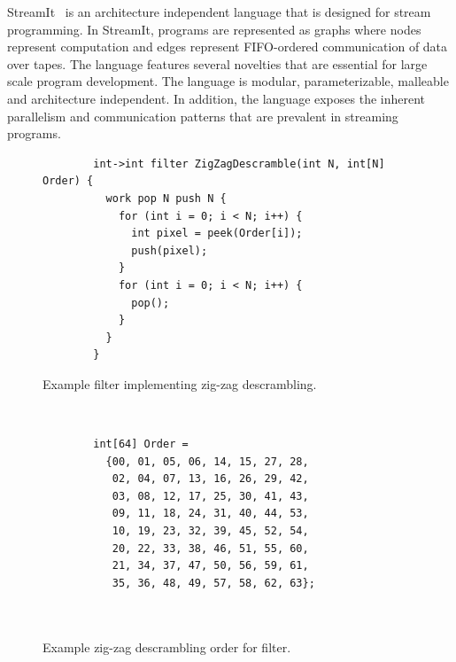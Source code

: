 \label{sec:streamit}

StreamIt~\cite{streamitcc} is an architecture independent language
that is designed for stream programming. In StreamIt, programs are
represented as graphs where nodes represent computation and edges
represent FIFO-ordered communication of data over tapes. The language
features several novelties that are essential for large scale program
development. The language is modular, parameterizable, malleable and
architecture independent. In addition, the language exposes the
inherent parallelism and communication patterns that are prevalent in
streaming programs.

\begin{figure}[t]
  \begin{minipage}[t]{4.0in}
    {
	\begin{scriptsize}
	  \begin{verbatim}
	    int->int filter ZigZagDescramble(int N, int[N] Order) {
	      work pop N push N {
	        for (int i = 0; i < N; i++) {
	          int pixel = peek(Order[i]);
	          push(pixel);
	        }
	        for (int i = 0; i < N; i++) {
	          pop();
	        }
	      }
	    }
	  \end{verbatim}
	\end{scriptsize}
    }
    \caption{Example filter implementing zig-zag descrambling.}
  \end{minipage}
  ~~\vrule~~
  \begin{minipage}[t]{3.0in}
    {  
	\begin{scriptsize}
	  \begin{verbatim}
	    int[64] Order = 
	      {00, 01, 05, 06, 14, 15, 27, 28,
	       02, 04, 07, 13, 16, 26, 29, 42,
	       03, 08, 12, 17, 25, 30, 41, 43,
	       09, 11, 18, 24, 31, 40, 44, 53,
	       10, 19, 23, 32, 39, 45, 52, 54,
	       20, 22, 33, 38, 46, 51, 55, 60,
	       21, 34, 37, 47, 50, 56, 59, 61,
	       35, 36, 48, 49, 57, 58, 62, 63};



	  \end{verbatim}
	\end{scriptsize}
    }
    \caption{Example zig-zag descrambling order for filter.}
    \label{fig:zigzag-order}
  \end{minipage}
\end{figure}

